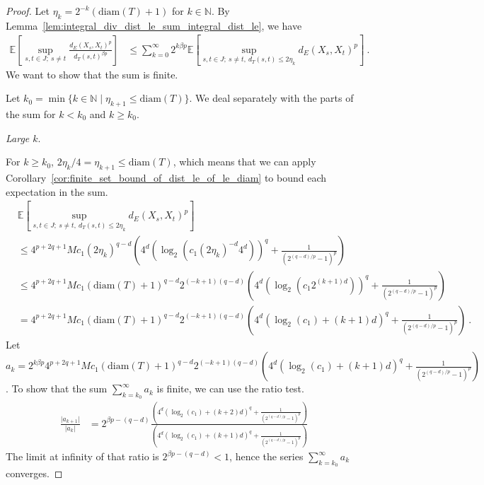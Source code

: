 \begin{proof}
Let $\eta_k = 2^{-k}(\mathrm{diam}(T) + 1)$ for $k \in \mathbb{N}$.
By Lemma~\ref{lem:integral_div_dist_le_sum_integral_dist_le}, we have
\begin{align*}
  \mathbb{E}\left[ \sup_{s, t \in J;\: s \ne t} \frac{d_E(X_s, X_t)^p}{d_T(s, t)^{\beta p}} \right]
  &\le \sum_{k=0}^\infty 2^{k \beta p} \mathbb{E}\left[ \sup_{s, t \in J;\: s \ne t, \: d_T(s, t) \le 2 \eta_k} d_E(X_s, X_t)^p \right]
  \: .
\end{align*}
We want to show that the sum is finite.

Let $k_0 = \min \{k \in \mathbb{N} \mid \eta_{k+1} \le \mathrm{diam}(T)\}$.
We deal separately with the parts of the sum for $k < k_0$ and $k \ge k_0$.

\emph{Large $k$}.

For $k \ge k_0$, $2\eta_k / 4 = \eta_{k+1} \le \mathrm{diam}(T)$, which means that we can apply Corollary~\ref{cor:finite_set_bound_of_dist_le_of_le_diam} to bound each expectation in the sum.
\begin{align*}
  &\mathbb{E}\left[ \sup_{s, t \in J;\: s \ne t, \: d_T(s, t) \le 2 \eta_k} d_E(X_s, X_t)^p \right]
  \\
  &\le 4^{p+2q+1} M c_1 (2 \eta_k)^{q-d} \left(4^d \left(\log_2 \left(c_1 (2 \eta_k)^{-d} 4^d \right) \right)^q
    + \frac{1}{\left( 2^{(q -d)/p} - 1\right)^p}\right)
  \\
  &\le 4^{p+2q+1} M c_1 (\mathrm{diam}(T)+1)^{q-d} 2^{(-k + 1)(q-d)} \left(4^d \left(\log_2 \left(c_1 2^{(k + 1)d} \right) \right)^q
    + \frac{1}{\left( 2^{(q -d)/p} - 1\right)^p}\right)
  \\
  &= 4^{p+2q+1} M c_1 (\mathrm{diam}(T)+1)^{q-d} 2^{(-k + 1)(q-d)} \left(4^d \left(\log_2(c_1) + (k + 1)d \right)^q
    + \frac{1}{\left( 2^{(q -d)/p} - 1\right)^p}\right)
  \: .
\end{align*}
Let $a_k = 2^{k \beta p} 4^{p+2q+1} M c_1 (\mathrm{diam}(T)+1)^{q-d} 2^{(-k + 1)(q-d)} \left(4^d \left(\log_2(c_1) + (k + 1)d \right)^q
    + \frac{1}{\left( 2^{(q -d)/p} - 1\right)^p}\right)$.
To show that the sum $\sum_{k=k_0}^\infty a_k$ is finite, we can use the ratio test.
\begin{align*}
  \frac{\vert a_{k+1} \vert}{\vert a_k \vert}
  &= 2^{\beta p - (q - d)}
    \frac{\left(4^d \left(\log_2(c_1) + (k + 2)d \right)^q + \frac{1}{\left( 2^{(q -d)/p} - 1\right)^p}\right)}
    {\left(4^d \left(\log_2(c_1) + (k + 1)d \right)^q + \frac{1}{\left( 2^{(q -d)/p} - 1\right)^p}\right)}
\end{align*}
The limit at infinity of that ratio is $2^{\beta p - (q - d)} < 1$, hence the series $\sum_{k=k_0}^\infty a_k$ converges.


\end{proof}
